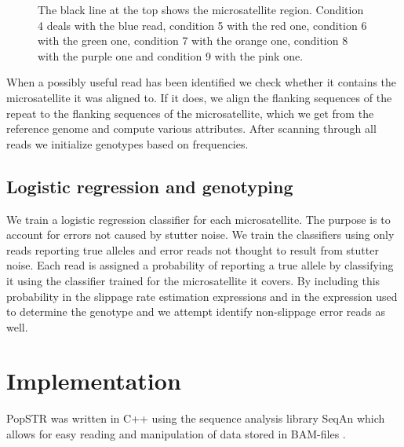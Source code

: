 \documentclass{bioinfo}
\begin{document}
    \begin{figure}[H]
        \centering
        \caption[Method for selecting reads]{The black line at the top shows the microsatellite region. Condition 4 deals with the blue read, condition 5 with the red one, condition 6 with the green one, condition 7 with the orange one, condition 8 with the purple one and condition 9 with the pink one.}
    \end{figure}
    
    \noindent When a possibly useful read has been identified we check whether it contains the microsatellite it was aligned to. If it does, we align the flanking sequences of the repeat to the flanking sequences of the microsatellite, which we get from the reference genome and compute various attributes.
    After scanning through all reads we initialize genotypes based on frequencies.
\subsection{Logistic regression and genotyping}
    We train a logistic regression classifier for each microsatellite. The purpose is to account for errors not caused by stutter noise. We train the classifiers using only reads reporting true alleles and error reads not thought to result from stutter noise. Each read is assigned a probability of reporting a true allele by classifying it using the classifier trained for the microsatellite it covers. By including this probability in the slippage rate estimation expressions and in the expression used to determine the genotype and we attempt identify non-slippage error reads as well.
\section{Implementation}
PopSTR was written in C++ using the sequence analysis library SeqAn which allows for easy reading and manipulation of data stored in BAM-files \cite{Doering2008}.
\end{document}
